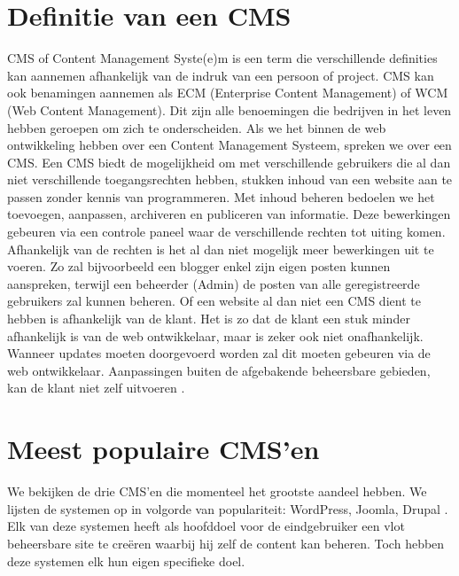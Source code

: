  \section{Definitie van een CMS}
CMS of Content Management Syste(e)m is een term die verschillende definities kan aannemen afhankelijk van de indruk van een persoon of project. CMS kan ook benamingen aannemen als ECM (Enterprise Content Management) of WCM (Web Content Management). Dit zijn alle benoemingen die bedrijven in het leven hebben geroepen om zich te onderscheiden.
\newline\newline
Als we het binnen de web ontwikkeling hebben over een Content Management Systeem, spreken we over een CMS. Een CMS biedt de mogelijkheid om met verschillende gebruikers die al dan niet verschillende toegangsrechten hebben, stukken inhoud van een website aan te passen zonder kennis van programmeren. Met inhoud beheren bedoelen we het toevoegen, aanpassen, archiveren en publiceren van informatie. Deze bewerkingen gebeuren via een controle paneel waar de verschillende rechten tot uiting komen. Afhankelijk van de rechten is het al dan niet mogelijk meer bewerkingen uit te voeren. Zo zal bijvoorbeeld een blogger enkel zijn eigen posten kunnen aanspreken, terwijl een beheerder (Admin) de posten van alle geregistreerde gebruikers zal kunnen beheren.
\newline\newline
Of een website al dan niet een CMS dient te hebben is afhankelijk van de klant. Het is zo dat de klant een stuk minder afhankelijk is van de web ontwikkelaar, maar is zeker ook niet onafhankelijk. Wanneer updates moeten doorgevoerd worden zal dit moeten gebeuren via de web ontwikkelaar. Aanpassingen buiten de afgebakende beheersbare gebieden, kan de klant niet zelf uitvoeren \citep{KohanBernard2010WhatCMS}.

 \section{Meest populaire CMS'en}
We bekijken de drie CMS'en die momenteel het grootste aandeel hebben. We lijsten de systemen op in volgorde van populariteit: WordPress, Joomla, Drupal \citep{BuiltWith2015CMSStatistics,W3Techs2016UsageWebsites}.
\newline\newline
Elk van deze systemen heeft als hoofddoel voor de eindgebruiker een vlot beheersbare site te creëren waarbij hij zelf de content kan beheren. Toch hebben deze systemen elk hun eigen specifieke doel.

